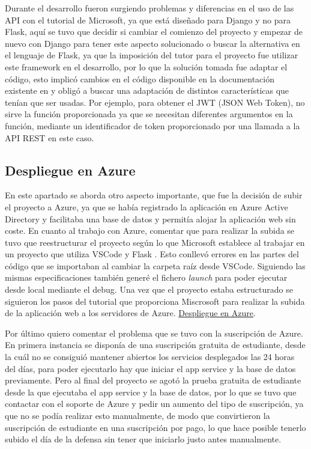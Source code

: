 Durante el desarrollo fueron surgiendo problemas y diferencias en el uso de las API con el tutorial de Microsoft, ya que está diseñado para Django y no para Flask, aquí se tuvo que decidir si cambiar el comienzo del proyecto y empezar de nuevo con Django para tener este aspecto solucionado o buscar la alternativa en el lenguaje de Flask, ya que la imposición del tutor para el proyecto fue utilizar este framework en el desarrollo, por lo que la solución tomada fue adaptar el código, esto implicó cambios en el código disponible en la documentación existente en \cite{pythonMicrosoftGraph} y obligó a buscar una adaptación de distintos características que tenían que ser usadas. Por ejemplo, para obtener el JWT (JSON Web Token), no sirve la función proporcionada ya que se necesitan diferentes argumentos en la función, mediante un identificador de token  proporcionado por una llamada a la API REST en este caso.\newline

\subsection{Despliegue en Azure}
En este apartado se aborda otro aspecto importante, que fue la decisión de subir el proyecto a Azure, ya que se había registrado la aplicación en Azure Active Directory y facilitaba una base de datos y permitía alojar la aplicación web sin coste.\newline
En cuanto al trabajo con Azure, comentar que para realizar la subida se tuvo que reestructurar el proyecto según lo que Microsoft establece al trabajar en un proyecto que utiliza VSCode y Flask \cite{pythonSample} \cite{flaskTutorialVSCode}.
Esto conllevó errores en las partes del código que se importaban al cambiar la carpeta raíz desde VSCode. Siguiendo las mismas especificaciones también generé el fichero \textit{launch} para poder ejecutar desde local mediante el debug.\newline
Una vez que el proyecto estaba estructurado se siguieron los pasos del tutorial que proporciona Miscrosoft para realizar la subida de la aplicación web a los servidores de Azure. \href{https://docs.microsoft.com/es-es/azure/developer/python/tutorial-deploy-app-service-on-linux-01}{Despliegue en Azure}\cite{deployVSCode}.\newline

Por último quiero comentar el problema que se tuvo con la suscripción de Azure. En primera instancia se disponía de una suscripción gratuita de estudiante, desde la cuál no se consiguió mantener abiertos los servicios desplegados las 24 horas del días, para poder ejecutarlo hay que iniciar el app service y la base de datos previamente. Pero al final del proyecto se agotó la prueba gratuita de estudiante desde la que ejecutaba el app service y la base de datos, por lo que se tuvo que contactar con el soporte de Azure y pedir un aumento del tipo de suscripción, ya que no se podía realizar esto manualmente, de modo que convirtieron la suscripción de estudiante en una suscripción por pago, lo que hace posible tenerlo subido el día de la defensa sin tener que iniciarlo justo antes manualmente.

